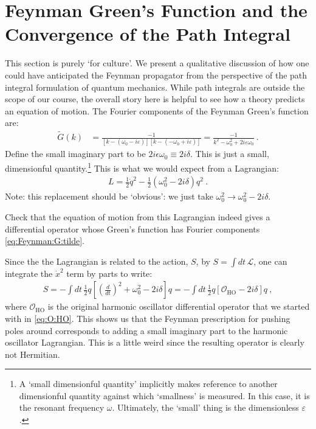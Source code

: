\section{Feynman Green's Function and the Convergence of the Path Integral}

This section is purely `for culture'. We present a qualitative discussion of how one could have anticipated the Feynman propagator from the perspective of the path integral formulation of quantum mechanics. While path integrals are outside the scope of our course, the overall story here is helpful to see how a theory predicts an equation of motion. The Fourier components of the Feynman Green's function are:
\begin{align}
  \tilde G(k) &=
  \frac{-1}{
  \left[k-(\omega_0 -i\varepsilon)\right]
  \left[k-(-\omega_0 + i\varepsilon)\right]
  }
  =
  \frac{-1}{
  k^2 - \omega_0^2 + 2i\varepsilon \omega_0
  }
  \ .
  \label{eq:Feynman:G:tilde}
\end{align}
Define the small imaginary part to be $2i\epsilon \omega_0 \equiv 2i\delta$. This is just a small, dimensionful quantity.\footnote{A `small dimensionful quantity' implicitly makes reference to another dimensionful quantity against which `smallness' is measured. In this case, it is the resonant frequency $\omega$. Ultimately, the `small' thing is the dimensionless $\varepsilon$.}  This is what we would expect from a Lagrangian:
\begin{align}
  L = \frac{1}{2}\dot q^2 - \frac{1}{2}\left(\omega_0^2 - 2i \delta\right)q^2 \ .
\end{align}
Note: this replacement should be `obvious': we just take $\omega_0^2 \to \omega_0^2 - 2i\delta$.
\begin{exercise}
Check that the equation of motion from this Lagrangian indeed gives a differential operator whose Green's function has Fourier components \eqref{eq:Feynman:G:tilde}.
\end{exercise}
Since the the Lagrangian is related to the action, $S$, by $S=\int dt\, \mathcal L$, one can integrate the $\dot x^2$ term by parts to write:
\begin{align}
  S = -\int dt \, \frac{1}{2}
  q 
  \left[\left(\frac{d}{dt}\right)^2 + \omega_0^2 - 2i\delta \right]
  q 
  =
  -\int dt \, \frac{1}{2}
  q 
  \left[\mathcal O_\text{HO} - 2i\delta \right]
  q  \ ,
  \label{eq:HO:S:Feynman:quad}
\end{align}
where $\mathcal O_\text{HO}$ is the original harmonic oscillator differential operator that we started with in \eqref{eq:O:HO}. This shows us that the Feynman prescription for pushing poles around corresponds to adding a small imaginary part to the harmonic oscillator Lagrangian. This is a little weird since the resulting operator is clearly not Hermitian.

